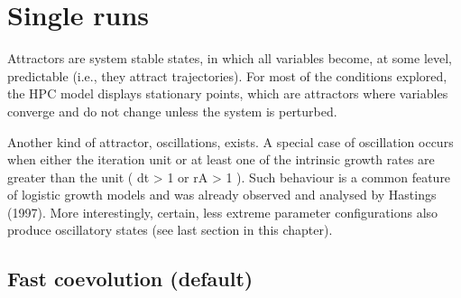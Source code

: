\documentclass[
]{book}
\begin{document}
\hypertarget{single-runs}{%
\chapter{Single runs}\label{single-runs}}

Attractors are system stable states, in which all variables become, at some level, predictable (i.e., they attract trajectories). For most of the conditions explored, the HPC model displays stationary points, which are attractors where variables converge and do not change unless the system is perturbed.

Another kind of attractor, oscillations, exists. A special case of oscillation occurs when either the iteration unit or at least one of the intrinsic growth rates are greater than the unit ( dt \textgreater{} 1 or rA \textgreater{} 1 ). Such behaviour is a common feature of logistic growth models and was already observed and analysed by Hastings (1997). More interestingly, certain, less extreme parameter configurations also produce oscillatory states (see last section in this chapter).

\newpage

\hypertarget{fast-coevolution-default}{%
\section{Fast coevolution (default)}\label{fast-coevolution-default}}
\end{document}

